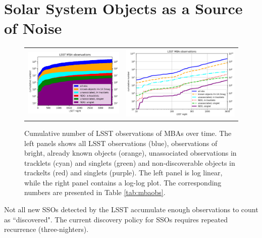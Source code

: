\section{Solar System Objects as a \gls{Source} of Noise} \label{sec:noise}
\begin{figure}[tb!]
\begin{center}
\begin{tabular}{cc}
\includegraphics[width=0.5\linewidth]{figs/cum_un_obs_first.png} &
\includegraphics[width=0.5\linewidth]{figs/cum_un_obs_first2.png}\\
\end{tabular}
\end{center}
\caption{Cumulative number of \gls{LSST} observations of MBAs over time. The left panels shows all \gls{LSST} observations (blue), observations of bright, already known objects (orange), unassociated observations in tracklets (cyan) and singlets (green) and non-discoverable objects in trackelts (red) and singlets (purple). 
The left panel is log linear, while the right panel contains a log-log plot. The corresponding numbers are presented in Table \ref{tab:mbaobs}.\label{fig:cum_un_obs}}
\end{figure}
%
Not all new SSOs detected by the \gls{LSST} accumulate enough observations to count as ``discovered". 
The current discovery policy for SSOs requires repeated recurrence (three-nighters).  
